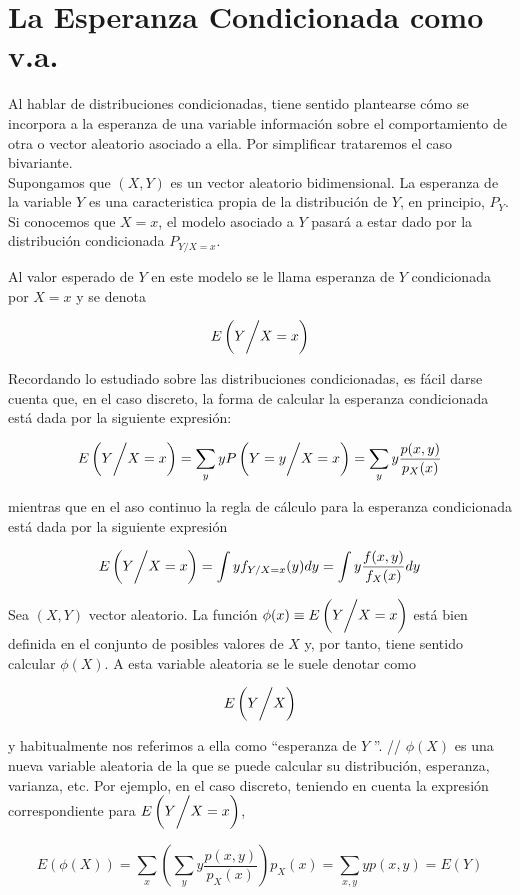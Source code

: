 \section{La Esperanza Condicionada como v.a.}


Al hablar de distribuciones condicionadas, tiene sentido plantearse cómo se incorpora a la esperanza de una variable información sobre el comportamiento de otra
o vector aleatorio asociado a ella. Por simplificar trataremos el caso bivariante. \\
Supongamos que $(X,Y)$ es un vector aleatorio bidimensional. La esperanza de la variable $Y$ es una caracteristica propia de la distribución de $Y$, en principio, $P_Y$.
Si conocemos que $X = x$, el modelo asociado a $Y$ pasará a estar dado por la distribución condicionada $P_{Y/X = x}$. 

\newpage

Al valor esperado de $Y$ en este modelo se le llama esperanza de $Y$ condicionada por $X=x$ y se denota

\[ E\left( Y \bigg{/} X = x \right) \]

Recordando lo estudiado sobre las distribuciones condicionadas, es fácil darse cuenta que, en el caso discreto, la forma de calcular la esperanza condicionada
está dada por la siguiente expresión:

\[ E\left( Y \bigg{/} X = x \right) = \sum_yyP\left(Y=y\bigg{/X=x}\right) = \sum_yy\frac{p(x,y)}{p_X(x)} \]

mientras que en el aso continuo la regla de cálculo para la esperanza condicionada está dada por la siguiente expresión

\[ E\left( Y \bigg{/} X = x \right) = \int yf_{Y/X=x}(y)dy = \int y\frac{f(x,y)}{f_X(x)}dy \]

Sea $(X,Y)$ vector aleatorio. La función $\phi(x) \equiv E\left( Y \bigg{/} X = x \right)$ está bien definida en el conjunto de posibles valores de $X$ y, por tanto,
tiene sentido calcular $\phi(X)$. A esta variable aleatoria se le suele denotar como

\[ E\left( Y \bigg{/} X \right) \]

y habitualmente nos referimos a ella como ``esperanza de $Y$ ''. //
$\phi(X)$ es una nueva variable aleatoria de la que se puede calcular su distribución, esperanza, varianza, etc. Por ejemplo, en el caso discreto, teniendo en cuenta
la expresión correspondiente para $E\left( Y \bigg{/} X = x \right)$,

\[ E(\phi(X)) = \sum_x \left( \sum_y y\frac{p(x,y)}{p_X(x)} \right) p_X(x) = \sum_{x,y}yp(x,y) = E(Y) \]


